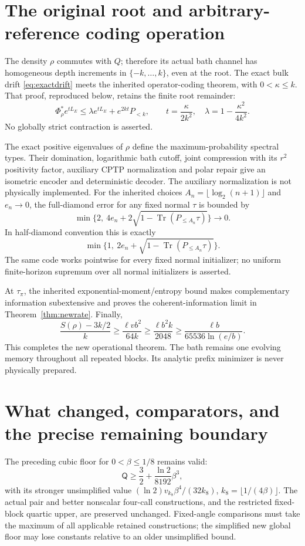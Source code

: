 \documentclass[11pt]{article}
\newcommand{\Tr}{\operatorname{Tr}}
\newcommand{\Qcap}{\mathsf Q}
\begin{document}
\section{The original root and arbitrary-reference coding operation}

The density \(\rho\) commutes with \(Q\); therefore its actual bath channel
has homogeneous depth increments in \(\{-k,\ldots,k\}\), even at the
root. The exact bulk drift \eqref{eq:exactdrift} meets the inherited
operator-coding theorem, with \(0<\kappa\le k\).
That proof, reproduced below, retains the finite root remainder:
\[
 \Phi_\rho^*e^{tL_E}\le
 \lambda e^{tL_E}+e^{2kt}P_{<k},\qquad
 t=\frac{\kappa}{2k^2},\quad
 \lambda=1-\frac{\kappa^2}{4k^2}.
\]
No globally strict contraction is asserted.

The exact positive eigenvalues of \(\rho\) define the maximum-probability
spectral types. Their domination, logarithmic bath cutoff, joint compression
with its \(r^2\) positivity factor, auxiliary CPTP normalization and polar
repair give an isometric encoder and deterministic decoder.
The auxiliary normalization is not physically implemented.
For the inherited choices \(A_n=\lfloor\log_2(n+1)\rfloor\) and \(e_n\to0\),
the full-diamond error for any fixed normal \(\tau\) is bounded by
\[
 \min\{2,\ 4e_n+2\sqrt{1-\Tr(P_{\le A_n}\tau)}\}\longrightarrow0.
\]
In half-diamond convention this is exactly
\[
 \min\{1,\ 2e_n+\sqrt{1-\Tr(P_{\le A_n}\tau)}\}.
\]
The same code works pointwise for every fixed normal initializer; no
uniform finite-horizon supremum over all normal initializers is asserted.

At \(\tau_\pi\), the inherited exponential-moment/entropy bound makes
complementary information subextensive and proves the coherent-information
limit in Theorem~\ref{thm:newrate}. Finally,
\[
 \frac{S(\rho)-3k/2}{k}\ge\frac{\ell vb^2}{64k}
 \ge\frac{\ell b^2k}{2048}
 \ge\frac{\ell b}{65536\ln(e/b)}.
\]
This completes the new operational theorem. The bath remains one evolving
memory throughout all repeated blocks. Its analytic prefix minimizer is
never physically prepared.

\section{What changed, comparators, and the precise remaining boundary}

The preceding cubic floor for \(0<\beta\le1/8\) remains valid:
\[
 \Qcap\ge\frac32+\frac{\ln2}{8192}\beta^3,
\]
with its stronger unsimplified value
\((\ln2)v_{k_8}\beta^4/(32k_8)\), \(k_8=\lfloor1/(4\beta)\rfloor\).
The actual pair and better nonscalar four-call constructions, and the
restricted fixed-block quartic upper, are preserved unchanged.
Fixed-angle comparisons must take the maximum of all applicable retained
constructions; the simplified new global floor may lose constants relative
to an older unsimplified bound.
\end{document}
